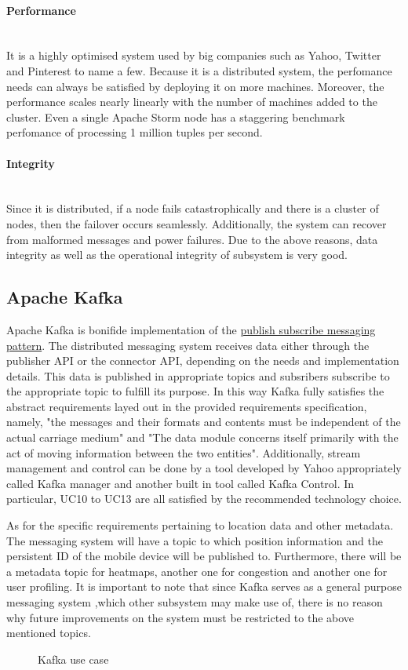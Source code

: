 \paragraph{Performance}
\mbox{}\\
It is a highly optimised system used by big companies such as Yahoo, Twitter and Pinterest to name a few. Because it is a distributed system, the perfomance needs can always be satisfied by deploying it on more machines. Moreover, the performance scales nearly linearly with the number of machines added to the cluster. Even a single Apache Storm node has a staggering benchmark perfomance of processing 1 million tuples per second.
\paragraph{Integrity}
\mbox{}\\
Since it is distributed, if a node fails catastrophically and there is a cluster of nodes, then the failover occurs seamlessly. Additionally, the system can recover from malformed messages and power failures. Due to the above reasons, data integrity as well as the operational integrity of subsystem is very good.

\subsection{Apache Kafka}
Apache Kafka is bonifide implementation of the \underline{publish subscribe messaging pattern}.
The distributed messaging system receives data either through the publisher API or the connector API, depending on the needs and implementation details. This data is published in appropriate topics and subsribers subscribe to the appropriate topic to fulfill its purpose. In this way Kafka fully satisfies the abstract requirements layed out in the provided requirements specification, namely, "the messages and their formats and contents must be independent of the actual carriage medium" and "The data module concerns itself primarily with the act of moving information between the two entities". Additionally, stream management and control can be done by a tool developed by Yahoo appropriately called Kafka manager and another built in tool called Kafka Control. In particular, UC10 to UC13 are all satisfied by the recommended technology choice.\par
\bigskip
\noindent
As for the specific requirements pertaining to location data and other metadata. The messaging system will have a topic to which position information and the persistent ID of the mobile device will be published to. Furthermore, there will be a metadata topic for heatmaps, another one for congestion and another one for user profiling.
It is important to note that since Kafka serves as a general purpose messaging system ,which other subsystem may make use of, there is no reason why future improvements on the system must be restricted to the above mentioned topics.
\begin{figure}[h]
\caption{Kafka use case}
\end{figure}

